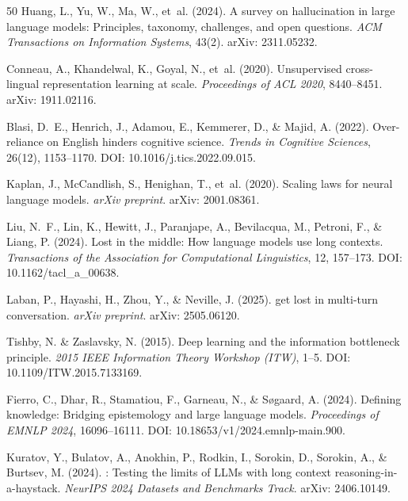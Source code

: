 \documentclass[11pt,a4paper]{article}
\begin{document}
\begin{thebibliography}{50}
Huang, L., Yu, W., Ma, W., et~al. (2024).
\newblock A survey on hallucination in large language models: Principles, taxonomy,
challenges, and open questions.
\newblock \emph{ACM Transactions on Information Systems}, 43(2).
\newblock arXiv: 2311.05232.

Conneau, A., Khandelwal, K., Goyal, N., et~al. (2020).
\newblock Unsupervised cross-lingual representation learning at scale.
\newblock \emph{Proceedings of ACL 2020}, 8440--8451.
\newblock arXiv: 1911.02116.

Blasi, D.~E., Henrich, J., Adamou, E., Kemmerer, D., \& Majid, A. (2022).
\newblock Over-reliance on {English} hinders cognitive science.
\newblock \emph{Trends in Cognitive Sciences}, 26(12), 1153--1170.
\newblock DOI: 10.1016/j.tics.2022.09.015.

Kaplan, J., McCandlish, S., Henighan, T., et~al. (2020).
\newblock Scaling laws for neural language models.
\newblock \emph{arXiv preprint}.
\newblock arXiv: 2001.08361.

Liu, N.~F., Lin, K., Hewitt, J., Paranjape, A., Bevilacqua, M., Petroni, F.,
\& Liang, P. (2024).
\newblock Lost in the middle: How language models use long contexts.
\newblock \emph{Transactions of the Association for Computational Linguistics},
12, 157--173.
\newblock DOI: 10.1162/tacl\_a\_00638.

Laban, P., Hayashi, H., Zhou, Y., \& Neville, J. (2025).
 get lost in multi-turn conversation.
\newblock \emph{arXiv preprint}.
\newblock arXiv: 2505.06120.

Tishby, N. \& Zaslavsky, N. (2015).
\newblock Deep learning and the information bottleneck principle.
\newblock \emph{2015 IEEE Information Theory Workshop (ITW)}, 1--5.
\newblock DOI: 10.1109/ITW.2015.7133169.

Fierro, C., Dhar, R., Stamatiou, F., Garneau, N., \& S{\o}gaard, A. (2024).
\newblock Defining knowledge: Bridging epistemology and large language models.
\newblock \emph{Proceedings of EMNLP 2024}, 16096--16111.
\newblock DOI: 10.18653/v1/2024.emnlp-main.900.

Kuratov, Y., Bulatov, A., Anokhin, P., Rodkin, I., Sorokin, D., Sorokin, A.,
\& Burtsev, M. (2024).
: Testing the limits of {LLMs} with long context
reasoning-in-a-haystack.
\newblock \emph{NeurIPS 2024 Datasets and Benchmarks Track}.
\newblock arXiv: 2406.10149.


\end{thebibliography}
\end{document}
